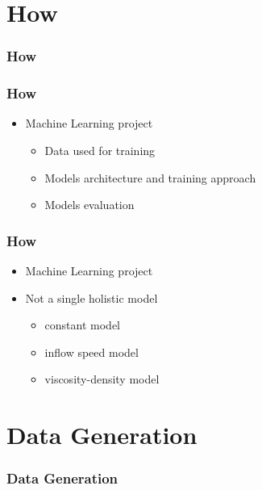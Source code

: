 \documentclass[18pt, xcolor=table]{beamer}
\begin{document}
\section{How}

\begin{frame}[t]
  \frametitle{How}
\end{frame}

\begin{frame}[t]
  \frametitle{How}
  \begin{itemize}
  \item Machine Learning project
    \begin{itemize}
    \item Data used for training
    \item Models architecture and training approach
    \item Models evaluation
    \end{itemize}
  \end{itemize}
\end{frame}

\begin{frame}[t]
  \frametitle{How}
  \begin{itemize}
  \item Machine Learning project
  \item Not a single holistic model
  \begin{itemize}
    \item constant model
    \item inflow speed model
    \item viscosity-density model
    \end{itemize}
  \end{itemize}
\end{frame}

\section{Data Generation}

\begin{frame}[t]
  \frametitle{Data Generation}
\end{frame}
\end{document}

